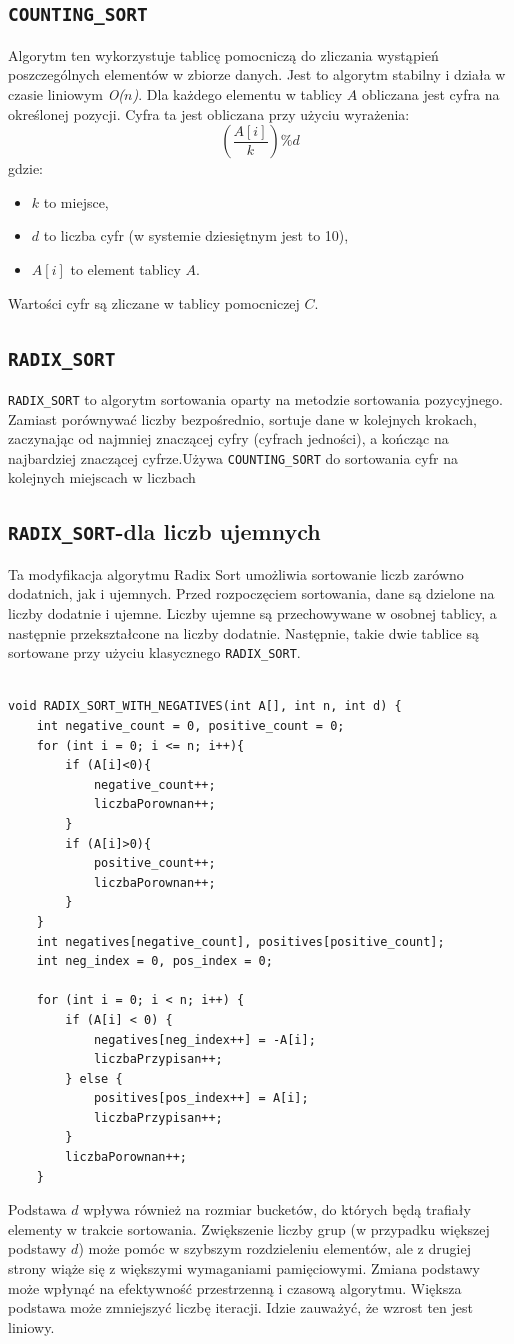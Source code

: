 \documentclass{article}
\begin{document}
\subsection{\texttt{COUNTING\_SORT}}
Algorytm ten wykorzystuje tablicę pomocniczą do zliczania wystąpień poszczególnych elementów w zbiorze danych. Jest to algorytm stabilny i działa w czasie liniowym  \emph{O($n$)}.
Dla każdego elementu w tablicy \( A \) obliczana jest cyfra na określonej pozycji. Cyfra ta jest obliczana przy użyciu wyrażenia:
\[
\left( \frac{A[i]}{k} \right) \% d
\]
gdzie:
\begin{itemize}
	\item \( k \) to miejsce,
	\item \( d \) to liczba cyfr (w systemie dziesiętnym jest to 10),
	\item \( A[i] \) to element tablicy \( A \).
\end{itemize}
Wartości cyfr są zliczane w tablicy pomocniczej \( C \).
\subsection{\texttt{RADIX\_SORT}}
\texttt{RADIX\_SORT} to algorytm sortowania oparty na metodzie sortowania pozycyjnego. Zamiast porównywać liczby bezpośrednio, sortuje dane w kolejnych krokach, zaczynając od najmniej znaczącej cyfry (cyfrach jedności), a kończąc na najbardziej znaczącej cyfrze.Używa \texttt{COUNTING\_SORT} do sortowania cyfr na kolejnych miejscach w liczbach
\subsection{\texttt{RADIX\_SORT}-dla liczb ujemnych}
Ta modyfikacja algorytmu Radix Sort umożliwia sortowanie liczb zarówno dodatnich, jak i ujemnych. Przed rozpoczęciem sortowania, dane są dzielone na liczby dodatnie i ujemne. Liczby ujemne są przechowywane w osobnej tablicy, a następnie przekształcone na liczby dodatnie. Następnie, takie dwie tablice są sortowane przy użyciu klasycznego \texttt{RADIX\_SORT}.
\begin{lstlisting}

void RADIX_SORT_WITH_NEGATIVES(int A[], int n, int d) {
	int negative_count = 0, positive_count = 0;
	for (int i = 0; i <= n; i++){
		if (A[i]<0){
			negative_count++;
			liczbaPorownan++;
		}
		if (A[i]>0){
			positive_count++;
			liczbaPorownan++;
		}
	}
	int negatives[negative_count], positives[positive_count];
	int neg_index = 0, pos_index = 0;
	
	for (int i = 0; i < n; i++) {
		if (A[i] < 0) {
			negatives[neg_index++] = -A[i];
			liczbaPrzypisan++;
		} else {
			positives[pos_index++] = A[i];
			liczbaPrzypisan++;
		}
		liczbaPorownan++;
	}
\end{lstlisting}
Podstawa \(d\) wpływa również na rozmiar bucketów, do których będą trafiały elementy w trakcie sortowania. Zwiększenie liczby grup (w przypadku większej podstawy \(d\)) może pomóc w szybszym rozdzieleniu elementów, ale z drugiej strony wiąże się z większymi wymaganiami pamięciowymi. Zmiana podstawy może wpłynąć na efektywność przestrzenną i czasową algorytmu. Większa podstawa może zmniejszyć liczbę iteracji. Idzie zauważyć, że wzrost ten jest liniowy.
\end{document}
